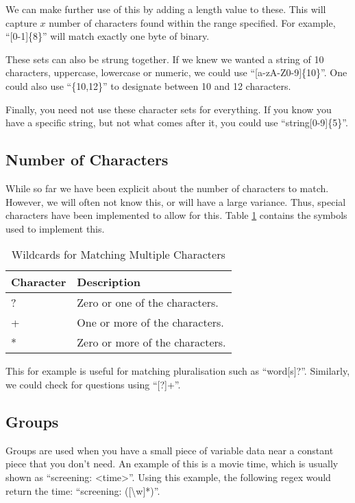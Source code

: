 			We can make further use of this by adding a length value to these.
			This will capture $x$ number of characters found within the range specified.
			For example, ``[0-1]\{8\}'' will match exactly one byte of binary.

			These sets can also be strung together.
			If we knew we wanted a string of 10 characters, uppercase, lowercase or numeric, we could use ``[a-zA-Z0-9]\{10\}''.
			One could also use ``\{10,12\}'' to designate between 10 and 12 characters.

			Finally, you need not use these character sets for everything.
			If you know you have a specific string, but not what comes after it, you could use ``string[0-9]\{5\}''.
		\subsection{Number of Characters}
			While so far we have been explicit about the number of characters to match.
			However, we will often not know this, or will have a large variance.
			Thus, special characters have been implemented to allow for this.
			Table \ref{tab:numberOfCharacters} contains the symbols used to implement this.

			\begin{table}[htb]
				\centering
				\begin{tabular}{ll}
					\toprule
					\textbf{Character} & \textbf{Description} \\
					\toprule
					? & Zero or one of the characters. \\
					+ & One or more of the characters. \\
					* & Zero or more of the characters. \\
					\bottomrule
				\end{tabular}
				\caption{Wildcards for Matching Multiple Characters}
				\label{tab:numberOfCharacters}
			\end{table}
			This for example is useful for matching pluralisation such as ``word[s]?''.
			Similarly, we could check for questions using ``[?]+''.

		\subsection{Groups}
			Groups are used when you have a small piece of variable data near a constant piece that you don't need.
			An example of this is a movie time, which is usually shown as ``screening: <time>''.
			Using this example, the following regex would return the time: ``screening: ([\textbackslash{}w]*)''.
